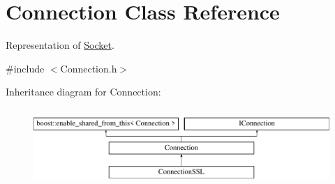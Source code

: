 \hypertarget{class_connection}{\section{Connection Class Reference}
\label{class_connection}
}


Representation of \hyperlink{class_socket}{Socket}.  




{\ttfamily \#include $<$Connection.\-h$>$}

Inheritance diagram for Connection\-:\begin{figure}[H]
\begin{center}
\leavevmode
\includegraphics[height=2.937063cm]{class_connection}
\end{center}
\end{figure}
